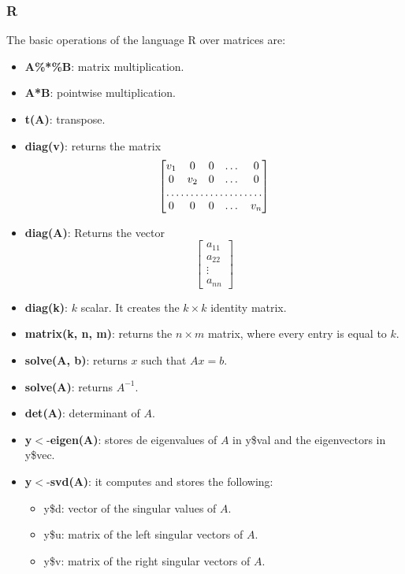\subsubsection*{R}

The basic operations of the language R over matrices are:

\begin{itemize}
	\item \textbf{A\%*\%B}: matrix multiplication.
	\item \textbf{A*B}: pointwise multiplication.
	\item \textbf{t(A)}: transpose.
	\item \textbf{diag(v)}: returns the matrix 
	\[
\begin{bmatrix}
    v_{1}       & 0 & 0 & \dots & 0 \\
    0       & v_{2} & 0 & \dots & 0 \\
    \hdotsfor{5} \\
    0       & 0 & 0 & \dots & v_{n}
\end{bmatrix}
\]
	\item \textbf{diag(A)}: Returns the vector
	\[
\begin{bmatrix}
    a_{11} \\
    a_{22} \\
    \vdots \\
    a_{nn}
\end{bmatrix}
\]
	\item \textbf{diag(k)}: $k$ scalar. It creates the $k\times k$ identity matrix.
	\item \textbf{matrix(k, n, m)}: returns the $n\times m$ matrix, where every entry is equal to $k$.
	\item \textbf{solve(A, b)}: returns $x$ such that $Ax=b$.
	\item \textbf{solve(A)}: returns $A^{-1}$.
	\item \textbf{det(A)}: determinant of $A$.
	\item \textbf{y}$<$-\textbf{eigen(A)}: stores de eigenvalues of $A$ in y\$val and the eigenvectors in y\$vec.
	\item \textbf{y}$<$-\textbf{svd(A)}: it computes and stores the following:
	\begin{itemize}
		\item y\$d: vector of the singular values of $A$.
		\item y\$u: matrix of the left singular vectors of $A$.
		\item y\$v: matrix of the right singular vectors of $A$.
	\end{itemize}

\end{itemize}
